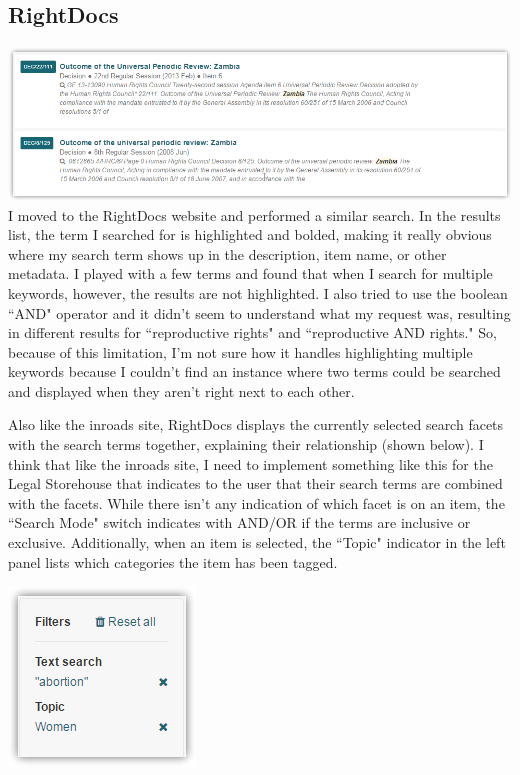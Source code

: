 \documentclass{article}
\begin{document}
\subsection{RightDocs}
\noindent\includegraphics[width=\textwidth]{images/2016-07-15-RightDocs}
I moved to the RightDocs website and performed a similar search. In the results list, the term I searched for is highlighted and bolded, making it really obvious where my search term shows up in the description, item name, or other metadata. I played with a few terms and found that when I search for multiple keywords, however, the results are not highlighted. I also tried to use the boolean ``AND" operator and it didn't seem to understand what my request was, resulting in different results for ``reproductive rights" and ``reproductive AND rights." So, because of this limitation, I'm not sure how it handles highlighting multiple keywords because I couldn't find an instance where two terms could be searched and displayed when they aren't right next to each other.

Also like the inroads site, RightDocs displays the currently selected search facets with the search terms together, explaining their relationship (shown below). I think that like the inroads site, I need to implement something like this for the Legal Storehouse that indicates to the user that their search terms are combined with the facets. While there isn't any indication of which facet is on an item, the ``Search Mode" switch indicates with AND/OR if the terms are inclusive or exclusive. Additionally, when an item is selected, the ``Topic" indicator in the left panel lists which categories the item has been tagged.

\begin{center}
\includegraphics{2016-07-15-RightDocs-facets}
\end{center} 
\end{document}
